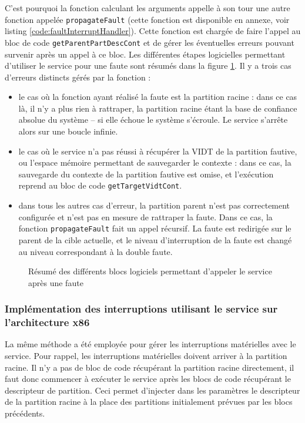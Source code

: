		C'est pourquoi la fonction calculant les arguments appelle à son tour une autre fonction appelée \texttt{propagateFault} (cette fonction est disponible en annexe, voir listing \ref{code:faultInterruptHandler}). Cette fonction est chargée de faire l'appel au bloc de code \texttt{getParentPartDescCont} et de gérer les éventuelles erreurs pouvant survenir après un appel à ce bloc. 
		Les différentes étapes logicielles permettant d'utiliser le service pour une faute sont résumés dans la figure \ref{fig:fault_software}. Il y a trois cas d'erreurs distincts gérés par la fonction :
		\begin{itemize}
			\item le cas où la fonction ayant réalisé la faute est la partition racine : dans ce cas là, il n'y a plus rien à rattraper, la partition racine étant la base de confiance absolue du système -- si elle échoue le système s'écroule. Le service s'arrête alors sur une boucle infinie.
			\item le cas où le service n'a pas réussi à récupérer la VIDT de la partition fautive, ou l'espace mémoire permettant de sauvegarder le contexte : dans ce cas, la sauvegarde du contexte de la partition fautive est omise, et l'exécution reprend au bloc de code \texttt{getTargetVidtCont}.
			\item dans tous les autres cas d'erreur, la partition parent n'est pas correctement configurée et n'est pas en mesure de rattraper la faute. Dans ce cas, la fonction \texttt{propagateFault} fait un appel récursif. La faute est redirigée sur le parent de la cible actuelle, et le niveau d'interruption de la faute est changé au niveau correspondant à la double faute.
		\end{itemize}


		\begin{figure}[!ht]
			\centering
			
			\caption{Résumé des différents blocs logiciels permettant d'appeler le service après une faute}
			\label{fig:fault_software}
		\end{figure}

		\subsubsection{Implémentation des interruptions utilisant le service sur l'architecture x86}

		La même méthode a été employée pour gérer les interruptions matérielles avec le service. Pour rappel, les interruptions matérielles doivent arriver à la partition racine. Il n'y a pas de bloc de code récupérant la partition racine directement, il faut donc commencer à exécuter le service après les blocs de code récupérant le descripteur de partition. Ceci permet d'injecter dans les paramètres le descripteur de la partition racine à la place des partitions initialement prévues par les blocs précédents.

